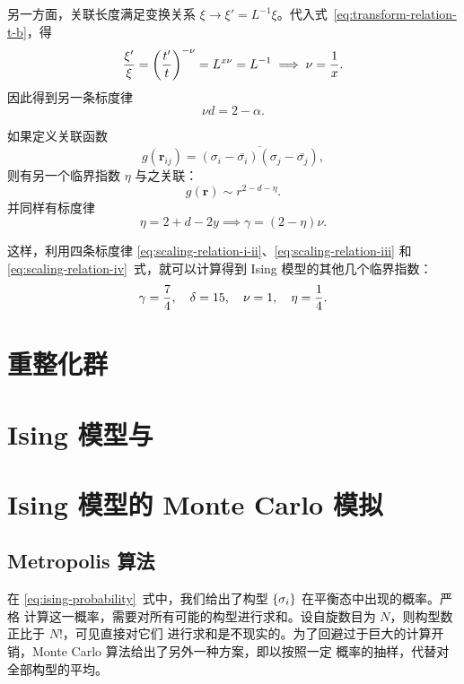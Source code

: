另一方面，关联长度满足变换关系 $\xi\to\xi'=L^{-1}\xi$。代入式~\eqref{eq:transform-relation-t-b}，得
\begin{equation}
  \frac{\xi'}{\xi} = \qty(\frac{t'}{t})^{-\nu} = L^{x\nu} = L^{-1}
  \implies \nu = \frac{1}{x}.
\end{equation}
因此得到另一条标度律
\begin{equation}
  \label{eq:scaling-relation-iii}
  \nu d = 2 - \alpha.
\end{equation}

如果定义关联函数
\begin{equation}
  g(\bm{r}_{ij}) = \overline{(\sigma_i-\bar{\sigma_i})(\sigma_j-\bar{\sigma_j})},
\end{equation}
则有另一个临界指数 $\eta$ 与之关联：
\begin{equation}
  g(\bm{r}) \sim r^{2-d-\eta}.
\end{equation}
并同样有标度律
\begin{equation}
  \label{eq:scaling-relation-iv}
  \eta = 2 + d - 2y \implies \gamma = (2-\eta) \nu.
\end{equation}

这样，利用四条标度律 \eqref{eq:scaling-relation-i-ii}、\eqref{eq:scaling-relation-iii} 和
\eqref{eq:scaling-relation-iv}~式，就可以计算得到 Ising 模型的其他几个临界指数：
\begin{equation}
  \gamma = \frac{7}{4} \qc
  \delta = 15          \qc
  \nu    = 1           \qc
  \eta   = \frac{1}{4}.
\end{equation}

\section{重整化群}
\section{Ising 模型与 \AdSCFT{}}
\section{Ising 模型的 Monte Carlo 模拟}

\subsection{Metropolis 算法}

在 \eqref{eq:ising-probability}~式中，我们给出了构型 ${\{\sigma_i\}}$ 在平衡态中出现的概率。严格
计算这一概率，需要对所有可能的构型进行求和。设自旋数目为 $N$，则构型数正比于 $N!$，可见直接对它们
进行求和是不现实的。为了回避过于巨大的计算开销，Monte Carlo 算法给出了另外一种方案，即以按照一定
概率的抽样，代替对全部构型的平均。

